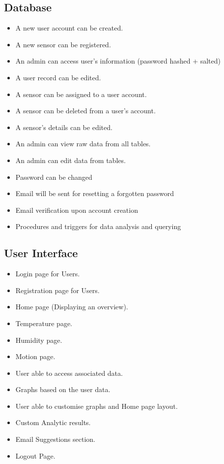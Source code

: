 \documentclass{article}
\begin{document}
            \subsection{Database}
            \begin{itemize}
                \item A new user account can be created.
                \item A new sensor can be registered.
                \item An admin can access user’s information (password hashed + salted)
                \item A user record can be edited.
                \item A sensor can be assigned to a user account.
                \item A sensor can be deleted from a user’s account.
                \item A sensor’s details can be edited.
                \item An admin can view raw data from all tables.
                \item An admin can edit data from tables.
                \item Password can be changed
                \item Email will be sent for resetting a forgotten password
                \item Email verification upon account creation
                \item Procedures and triggers for data analysis and querying 
            \end{itemize}

            \subsection{User Interface}
            \begin{itemize}
                \item Login page for Users.
                \item Registration page for Users.
                \item Home page (Displaying an overview).
                \item Temperature page.
                \item Humidity page.
                \item Motion page.
                \item User able to access associated data.
                \item Graphs based on the user data.
                \item User able to customise graphs and Home page layout.
                \item Custom Analytic results.
                \item Email Suggestions section.
                \item Logout Page.
            \end{itemize}
\end{document}
